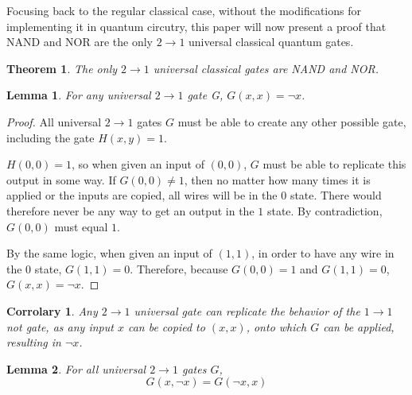 \documentclass[12pt]{article}
\begin{document}
Focusing back to the regular classical case, without the modifications for implementing it in quantum circutry, this paper will now present a proof that NAND and NOR are the only $2 \to 1$ universal classical quantum gates.


\newtheorem{theorem}{Theorem}
\newtheorem{lemma}{Lemma}
\newtheorem{corrolary}{Corrolary}

\begin{theorem}
    The only $2 \to 1$ universal classical gates are NAND and NOR.
\end{theorem}

\begin{lemma}
    For any universal $2 \to 1$ gate G, $G(x, x) = \neg x$.
\end{lemma}

\begin{proof}
    All universal $2 \to 1$ gates $G$ must be able to create any other possible gate, including the gate $H(x, y) = 1$.

    $H(0, 0) = 1$, so when given an input of $(0, 0)$, $G$ must be able to replicate this output in some way. If $G(0, 0) \ne 1$, then no matter how many times it is applied or the inputs are copied, all wires will be in the $0$ state. There would therefore never be any way to get an output in the $1$ state. By contradiction, $G(0, 0)$ must equal $1$.
    
    By the same logic, when given an input of $(1, 1)$, in order to have any wire in the $0$ state, $G(1, 1) = 0$.
    Therefore, because $G(0, 0) = 1$ and $G(1, 1) = 0$, $G(x, x) = \neg x$. 
\end{proof}

\begin{corrolary}
    Any $2 \to 1$ universal gate can replicate the behavior of the $1 \to 1$ not gate, as any input $x$ can be copied to $(x, x)$, onto which $G$ can be applied, resulting in $\neg x$.
\end{corrolary}

\begin{lemma}
    For all universal $2 \to 1$ gates $G$,
    $$G(x, \neg x) = G(\neg x, x)$$
\end{lemma}
\end{document}
